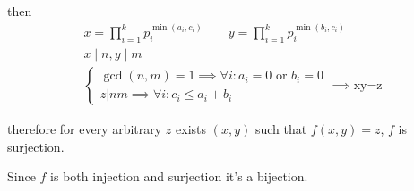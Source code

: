 \documentclass[12pt]{article}
\begin{document}
\begin{enumerate}
\begin{enumerate}
                then
                \[
                \begin{gathered}
                  x=\prod_{i=1}^{k}p_{i}^{\min(a_{i}, c_{i})} \qquad
                  y=\prod_{i=1}^{k}p_{i}^{\min(b_{i}, c_{i})} \\
                  x \mid n, y \mid m \\
                  \begin{cases}
                    \gcd(n,m)=1 \implies \forall i: a_{i}=0 \text{ or } b_{i}=0\\
                    z|nm \implies \forall i: c_{i} \leq a_{i} + b_{i}
                  \end{cases}
                  \implies \text{xy=z}
                \end{gathered}
                \]

                therefore for every arbitrary $z$ exists $(x, y)$ such that $f(x,y)=z$, $f$ is surjection.
        \end{enumerate}

        Since $f$ is both injection and surjection it's a bijection.

\end{enumerate}
\end{document}
